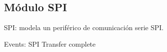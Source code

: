 \subsection{Módulo SPI}

SPI: modela un periférico de comunicación serie SPI.


Events:
SPI Transfer complete
